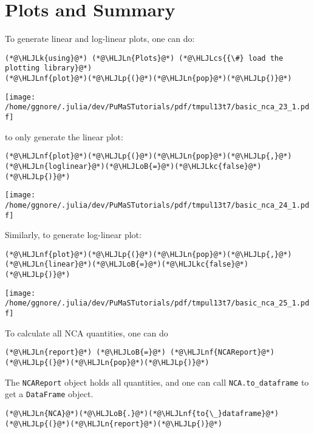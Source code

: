 \documentclass[12pt,a4paper]{article}
\newcommand{\HLJLk}[1]{\textcolor[RGB]{148,91,176}{\textbf{#1}}}
\newcommand{\HLJLkc}[1]{\textcolor[RGB]{59,151,46}{\textit{#1}}}
\newcommand{\HLJLn}[1]{#1}
\newcommand{\HLJLnf}[1]{\textcolor[RGB]{66,102,213}{#1}}
\newcommand{\HLJLoB}[1]{\textcolor[RGB]{102,102,102}{\textbf{#1}}}
\newcommand{\HLJLp}[1]{#1}
\newcommand{\HLJLcs}[1]{\textcolor[RGB]{153,153,119}{\textit{#1}}}
\begin{document}
\section{Plots and Summary}
To generate linear and log-linear plots, one can do:


\begin{lstlisting}
(*@\HLJLk{using}@*) (*@\HLJLn{Plots}@*) (*@\HLJLcs{{\#} load the plotting library}@*)
(*@\HLJLnf{plot}@*)(*@\HLJLp{(}@*)(*@\HLJLn{pop}@*)(*@\HLJLp{)}@*)
\end{lstlisting}

\texttt{[image: /home/ggnore/.julia/dev/PuMaSTutorials/pdf/tmpul13t7/basic\_nca\_23\_1.pdf]}

to only generate the linear plot:


\begin{lstlisting}
(*@\HLJLnf{plot}@*)(*@\HLJLp{(}@*)(*@\HLJLn{pop}@*)(*@\HLJLp{,}@*) (*@\HLJLn{loglinear}@*)(*@\HLJLoB{=}@*)(*@\HLJLkc{false}@*)(*@\HLJLp{)}@*)
\end{lstlisting}

\texttt{[image: /home/ggnore/.julia/dev/PuMaSTutorials/pdf/tmpul13t7/basic\_nca\_24\_1.pdf]}

Similarly, to generate log-linear plot:


\begin{lstlisting}
(*@\HLJLnf{plot}@*)(*@\HLJLp{(}@*)(*@\HLJLn{pop}@*)(*@\HLJLp{,}@*) (*@\HLJLn{linear}@*)(*@\HLJLoB{=}@*)(*@\HLJLkc{false}@*)(*@\HLJLp{)}@*)
\end{lstlisting}

\texttt{[image: /home/ggnore/.julia/dev/PuMaSTutorials/pdf/tmpul13t7/basic\_nca\_25\_1.pdf]}

To calculate all NCA quantities, one can do


\begin{lstlisting}
(*@\HLJLn{report}@*) (*@\HLJLoB{=}@*) (*@\HLJLnf{NCAReport}@*)(*@\HLJLp{(}@*)(*@\HLJLn{pop}@*)(*@\HLJLp{)}@*)
\end{lstlisting}


The \texttt{NCAReport} object holds all quantities, and one can call \texttt{NCA.to\_dataframe} to get a \texttt{DataFrame} object.


\begin{lstlisting}
(*@\HLJLn{NCA}@*)(*@\HLJLoB{.}@*)(*@\HLJLnf{to{\_}dataframe}@*)(*@\HLJLp{(}@*)(*@\HLJLn{report}@*)(*@\HLJLp{)}@*)
\end{lstlisting}
\end{document}

